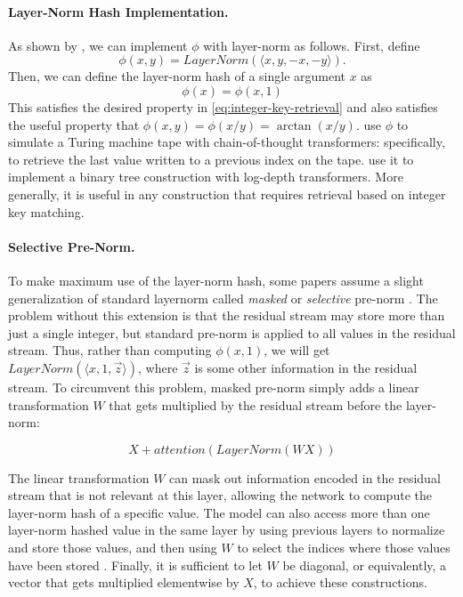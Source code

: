 \paragraph{Layer-Norm Hash Implementation.}
As shown by \citet{merrill-sabharwal-2024-cot}, we can implement $\phi$ with layer-norm as follows. First, define
\begin{equation*}
    \phi(x, y) = LayerNorm(\langle x, y, -x, -y \rangle) .
\end{equation*}
Then, we can define the layer-norm hash of a single argument $x$ as
\begin{equation*}
    \phi(x) = \phi(x, 1)
\end{equation*}
This satisfies the desired property in \eqref{eq:integer-key-retrieval} and also satisfies the useful property that $\phi(x, y) = \phi(x/y) = \arctan(x/y)$.
\citet{merrill-sabharwal-2024-cot} use $\phi$ to simulate a Turing machine tape with chain-of-thought transformers: specifically, to retrieve the last value written to a previous index on the tape.
\citet{merrill2024little} use it to implement a binary tree construction with log-depth transformers.
More generally, it is useful in any construction that requires retrieval based on integer key matching.

\paragraph{Selective Pre-Norm.}
To make maximum use of the layer-norm hash, some papers assume a slight generalization of standard layernorm called \emph{masked} or \emph{selective} pre-norm \citep{merrill-sabharwal-2024-cot,merrill2024little}.
The problem without this extension is that the residual stream may store more than just a single integer, but standard pre-norm is applied to all values in the residual stream. Thus, rather than computing $\phi(x, 1)$, we will get $LayerNorm(\langle x, 1, \vec z \rangle)$, where $\vec z$ is some other information in the residual stream.
To circumvent this problem, masked pre-norm simply adds a linear transformation $W$ that gets multiplied by the residual stream before the layer-norm:

\[X + attention(LayerNorm(W X))\]

The linear transformation $W$ can mask out information encoded in the residual stream that is not relevant at this layer, allowing the network to compute the layer-norm hash of a specific value.
The model can also access more than one layer-norm hashed value in the same layer by using previous layers to normalize and store those values, and then using $W$ to select the indices where those values have been stored \citep{merrill-sabharwal-2024-cot}.
Finally, it is sufficient to let $W$ be diagonal, or equivalently, a vector that gets multiplied elementwise by $X$, to achieve these constructions.